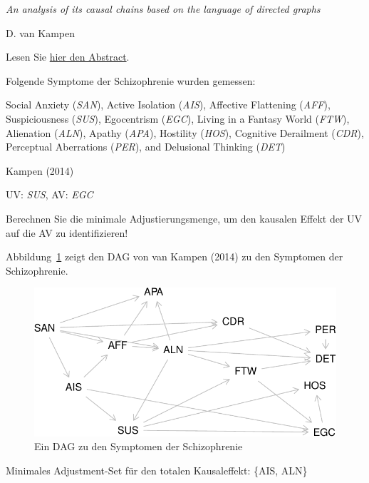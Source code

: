 \documentclass[
  a4paper,
  DIV=11]{scrreprt}
\theoremstyle{definition}
\theoremstyle{remark}
\begin{document}
\emph{An analysis of its causal chains based on the language of directed
graphs}

D. van Kampen

Lesen Sie
\href{https://www.cambridge.org/core/journals/european-psychiatry/article/abs/ssq-model-of-schizophrenic-prodromal-unfolding-revised-an-analysis-of-its-causal-chains-based-on-the-language-of-directed-graphs/F2E7BBFC1B392616DB894AFBFABE7818}{hier
den Abstract}.

Folgende Symptome der Schizophrenie wurden gemessen:

Social Anxiety (\emph{SAN}), Active Isolation (\emph{AIS}), Affective
Flattening (\emph{AFF}), Suspiciousness (\emph{SUS}), Egocentrism
(\emph{EGC}), Living in a Fantasy World (\emph{FTW}), Alienation
(\emph{ALN}), Apathy (\emph{APA}), Hostility (\emph{HOS}), Cognitive
Derailment (\emph{CDR}), Perceptual Aberrations (\emph{PER}), and
Delusional Thinking (\emph{DET})

Kampen (2014)

UV: \emph{SUS}, AV: \emph{EGC}

Berechnen Sie die minimale Adjustierungsmenge, um den kausalen Effekt
der UV auf die AV zu identifizieren!

Abbildung~\ref{fig-van-kampen} zeigt den DAG von van Kampen (2014) zu
den Symptomen der Schizophrenie.

\begin{figure}

{\centering \includegraphics{./abschluss_files/figure-pdf/fig-van-kampen-1.pdf}

}

\caption{\label{fig-van-kampen}Ein DAG zu den Symptomen der
Schizophrenie}

\end{figure}

Minimales Adjustment-Set für den totalen Kausaleffekt: \{AIS, ALN\}
\end{document}
